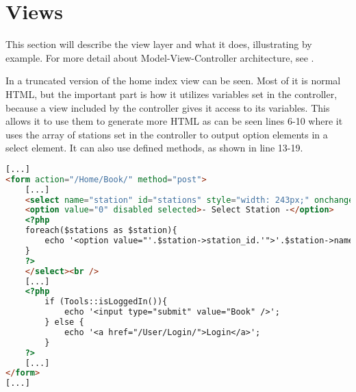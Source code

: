 \section{Views}
This section will describe the view layer and what it does, illustrating by example. For more detail about Model-View-Controller architecture, see .

In  a truncated version of the home index view can be seen. 
Most of it is normal HTML, but the important part is how it utilizes variables set in the controller, because a view included by the controller gives it access to its variables. 
This allows it to use them to generate more HTML as can be seen lines 6-10 where it uses the array of stations set in the controller to output option elements in a select element.
It can also use defined methods, as shown in line 13-19.

\begin{lstlisting}[language=html, label=lst:homeIndexView, caption={Home Index View}]
[...]
<form action="/Home/Book/" method="post">
    [...]
    <select name="station" id="stations" style="width: 243px;" onchange="UpdateMarker()">
    <option value="0" disabled selected>- Select Station -</option>
    <?php
    foreach($stations as $station){
        echo '<option value="'.$station->station_id.'">'.$station->name.'</option>';
    }
    ?>
    </select><br />
    [...]
    <?php
        if (Tools::isLoggedIn()){
            echo '<input type="submit" value="Book" />';
        } else {
            echo '<a href="/User/Login/">Login</a>';
        }
    ?>
    [...]
</form>
[...]
\end{lstlisting}
